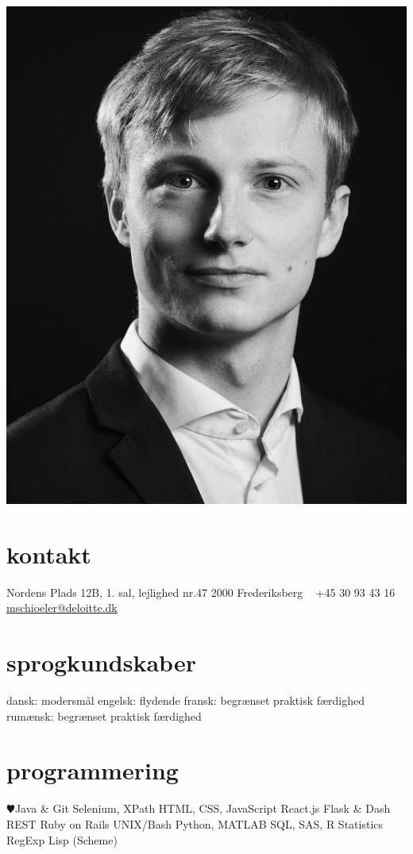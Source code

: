 \documentclass[]{../friggeri-cv} %
\begin{document}


\begin{aside} %
\includegraphics[width=\linewidth]{../graphics/pic8x10.jpg}
\section{kontakt}
Nordens Plads 12B,
1. sal, lejlighed nr.47
2000 Frederiksberg
~
+45 30 93 43 16
{\small \href{mschioeler@deloitte.dk}{mschioeler@deloitte.dk}}
\section{sprogkundskaber}
	dansk:  \quad modersmål
	engelsk: \quad flydende
	fransk: \quad begrænset praktisk færdighed
	rumænsk: \quad begrænset praktisk færdighed
\section{programmering}
{\color{red} $\varheartsuit$}Java \& Git 
Selenium, XPath
HTML, CSS, JavaScript
React.js
Flask \& Dash
REST
Ruby on Rails
UNIX/Bash
Python, \textsc{MATLAB}
SQL, SAS, R Statistics
RegExp
Lisp (Scheme)
\end{aside}
\end{document}

